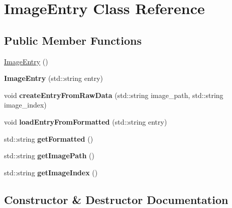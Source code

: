 \hypertarget{class_image_entry}{}\section{Image\+Entry Class Reference}
\label{class_image_entry}
\subsection*{Public Member Functions}
\begin{DoxyCompactItemize}
\item 
\hyperlink{class_image_entry_a38da928b7b3cf2aba92dcd68e247be02}{Image\+Entry} ()
\item 
\hypertarget{class_image_entry_aa9e49f87ec265c987f851f85dcb943dd}{}{\bfseries Image\+Entry} (std\+::string entry)\label{class_image_entry_aa9e49f87ec265c987f851f85dcb943dd}

\item 
\hypertarget{class_image_entry_a36191f60df1816127638bb7307e52e17}{}void {\bfseries create\+Entry\+From\+Raw\+Data} (std\+::string image\+\_\+path, std\+::string image\+\_\+index)\label{class_image_entry_a36191f60df1816127638bb7307e52e17}

\item 
\hypertarget{class_image_entry_a25cfc16c24e978a10522010a08d12341}{}void {\bfseries load\+Entry\+From\+Formatted} (std\+::string entry)\label{class_image_entry_a25cfc16c24e978a10522010a08d12341}

\item 
\hypertarget{class_image_entry_a3e9e6cbd8a6717b0e89ee03c09094c0a}{}std\+::string {\bfseries get\+Formatted} ()\label{class_image_entry_a3e9e6cbd8a6717b0e89ee03c09094c0a}

\item 
\hypertarget{class_image_entry_a98018f3c49ecc9d4d2f56f9871c82ead}{}std\+::string {\bfseries get\+Image\+Path} ()\label{class_image_entry_a98018f3c49ecc9d4d2f56f9871c82ead}

\item 
\hypertarget{class_image_entry_a8a729fad149ac4275e84cb6b54b5ad58}{}std\+::string {\bfseries get\+Image\+Index} ()\label{class_image_entry_a8a729fad149ac4275e84cb6b54b5ad58}

\end{DoxyCompactItemize}


\subsection{Constructor \& Destructor Documentation}
\hypertarget{class_image_entry_a38da928b7b3cf2aba92dcd68e247be02}{}
